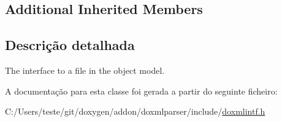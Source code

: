 \subsection*{Additional Inherited Members}


\subsection{Descrição detalhada}
The interface to a file in the object model. 

A documentação para esta classe foi gerada a partir do seguinte ficheiro\-:\begin{DoxyCompactItemize}
\item 
C\-:/\-Users/teste/git/doxygen/addon/doxmlparser/include/\hyperlink{include_2doxmlintf_8h}{doxmlintf.\-h}\end{DoxyCompactItemize}
